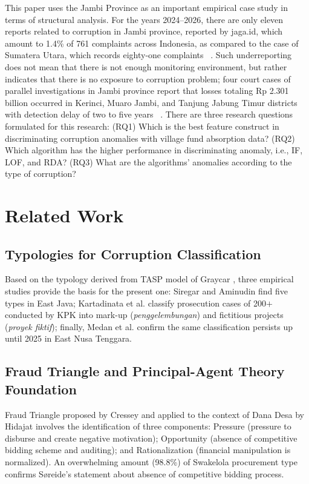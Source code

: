 \documentclass[3p,times,procedia]{elsarticle}
\begin{document}
This paper uses the Jambi Province as an important empirical case study in terms of structural analysis. For the years 2024–2026, there are only eleven reports related to corruption in Jambi province, reported by jaga.id, which amount to 1.4\% of 761 complaints across Indonesia, as compared to the case of Sumatera Utara, which records eighty-one complaints ~\cite{ref9}. Such underreporting does not mean that there is not enough monitoring environment, but rather indicates that there is no exposure to corruption problem; four court cases of parallel investigations in Jambi province report that losses totaling Rp 2.301 billion occurred in Kerinci, Muaro Jambi, and Tanjung Jabung Timur districts with detection delay of two to five years ~\cite{ref15,ref16,ref17,ref18}. There are three research questions formulated for this research: (RQ1) Which is the best feature construct in discriminating corruption anomalies with village fund absorption data? (RQ2) Which algorithm has the higher performance in discriminating anomaly, i.e., IF, LOF, and RDA? (RQ3) What are the algorithms’ anomalies according to the type of corruption?

\section{Related Work}
\label{sec:related}


\subsection{Typologies for Corruption Classification}

Based on the typology derived from TASP model of Graycar \cite{ref19}, three empirical studies provide the basis for the present one: Siregar and Aminudin \cite{ref13} find five types in East Java; Kartadinata et al. \cite{ref14} classify prosecution cases of 200$+$ conducted by KPK into mark-up (\textit{penggelembungan}) and fictitious projects (\textit{proyek fiktif}); finally, Medan et al. \cite{ref20} confirm the same classification persists up until 2025 in East Nusa Tenggara.

\subsection{Fraud Triangle and Principal-Agent Theory Foundation}

Fraud Triangle proposed by Cressey \cite{ref21} and applied to the context of Dana Desa by Hidajat \cite{ref12} involves the identification of three components: Pressure (pressure to disburse and create negative motivation); Opportunity (absence of competitive bidding scheme and auditing); and Rationalization (financial manipulation is normalized). An overwhelming amount (98.8\%) of Swakelola procurement type confirms S{\o}reide's \cite{ref22} statement about absence of competitive bidding process.
\end{document}
